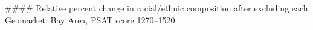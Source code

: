 #### Relative percent change in racial/ethnic composition after excluding each Geomarket: Bay Area, PSAT score 1270–1520
